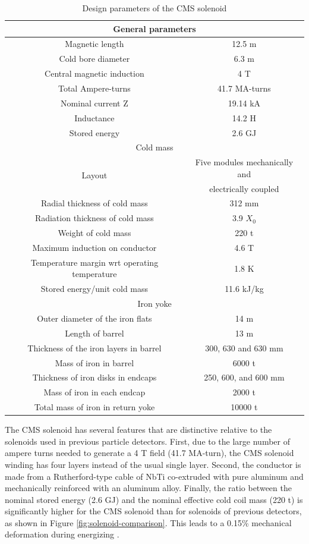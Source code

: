 \begin{table}
  \begin{tabular}{c|c}
    \multicolumn{2}{c}{General parameters} \\
    \hline\hline
    Magnetic length & 12.5 m \\
    Cold bore diameter & 6.3 m \\
    Central magnetic induction & 4 T \\
    Total Ampere-turns & 41.7 MA-turns \\ 
    Nominal current Z & 19.14 kA \\
    Inductance & 14.2 H \\
    Stored energy & 2.6 GJ \\
    \hline\hline
    \multicolumn{2}{c}{Cold mass} \\
    \hline\hline
    \multirow{2}{*}{Layout} & Five modules mechanically and \\ 
    & electrically coupled \\ 
    Radial thickness of cold mass & 312 mm \\
    Radiation thickness of cold mass & 3.9 $X_0$ \\ 
    Weight of cold mass & 220 t \\
    Maximum induction on conductor & 4.6 T \\ 
    Temperature margin wrt operating temperature & 1.8 K \\
    Stored energy/unit cold mass & 11.6 kJ/kg \\
    \hline\hline
    \multicolumn{2}{c}{Iron yoke} \\
    \hline\hline
    Outer diameter of the iron flats & 14 m \\ 
    Length of barrel & 13 m \\
    Thickness of the iron layers in barrel & 300, 630 and 630 mm \\
    Mass of iron in barrel & 6000 t \\
    Thickness of iron disks in endcaps & 250, 600, and 600 mm \\ 
    Mass of iron in each endcap & 2000 t \\ 
    Total mass of iron in return yoke & 10000 t \\
  \end{tabular}
  \caption{Design parameters of the CMS solenoid \cite{cms-jinst}}
  \label{tab:solenoid} 
\end{table}

The CMS solenoid has several features that are distinctive relative to the
solenoids used in previous particle detectors.  First,
due to the large number of ampere turns needed to generate a 4 T field 
(41.7 MA-turn), the CMS solenoid winding has four layers instead of the usual single layer.
Second, the conductor is made from a Rutherford-type cable of NbTi co-extruded
with pure aluminum and mechanically reinforced with an aluminum alloy.
Finally, the ratio between the nominal stored energy (2.6 GJ) and the nominal 
effective cold coil mass (220 t) is significantly higher for the CMS solenoid
than for solenoids of previous detectors, as shown in Figure \ref{fig:solenoid-comparison}.
This leads to a 0.15\% mechanical deformation during energizing \cite{cms-jinst,cms-tdr}.

